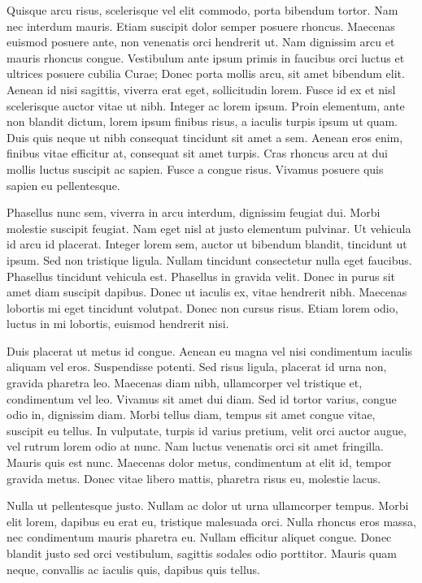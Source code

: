 \documentclass[11pt,]{article}
\begin{document}
Quisque arcu risus, scelerisque vel elit commodo, porta bibendum tortor.
Nam nec interdum mauris. Etiam suscipit dolor semper posuere rhoncus.
Maecenas euismod posuere ante, non venenatis orci hendrerit ut. Nam
dignissim arcu et mauris rhoncus congue. Vestibulum ante ipsum primis in
faucibus orci luctus et ultrices posuere cubilia Curae; Donec porta
mollis arcu, sit amet bibendum elit. Aenean id nisi sagittis, viverra
erat eget, sollicitudin lorem. Fusce id ex et nisl scelerisque auctor
vitae ut nibh. Integer ac lorem ipsum. Proin elementum, ante non blandit
dictum, lorem ipsum finibus risus, a iaculis turpis ipsum ut quam. Duis
quis neque ut nibh consequat tincidunt sit amet a sem. Aenean eros enim,
finibus vitae efficitur at, consequat sit amet turpis. Cras rhoncus arcu
at dui mollis luctus suscipit ac sapien. Fusce a congue risus. Vivamus
posuere quis sapien eu pellentesque.

Phasellus nunc sem, viverra in arcu interdum, dignissim feugiat dui.
Morbi molestie suscipit feugiat. Nam eget nisl at justo elementum
pulvinar. Ut vehicula id arcu id placerat. Integer lorem sem, auctor ut
bibendum blandit, tincidunt ut ipsum. Sed non tristique ligula. Nullam
tincidunt consectetur nulla eget faucibus. Phasellus tincidunt vehicula
est. Phasellus in gravida velit. Donec in purus sit amet diam suscipit
dapibus. Donec ut iaculis ex, vitae hendrerit nibh. Maecenas lobortis mi
eget tincidunt volutpat. Donec non cursus risus. Etiam lorem odio,
luctus in mi lobortis, euismod hendrerit nisi.

Duis placerat ut metus id congue. Aenean eu magna vel nisi condimentum
iaculis aliquam vel eros. Suspendisse potenti. Sed risus ligula,
placerat id urna non, gravida pharetra leo. Maecenas diam nibh,
ullamcorper vel tristique et, condimentum vel leo. Vivamus sit amet dui
diam. Sed id tortor varius, congue odio in, dignissim diam. Morbi tellus
diam, tempus sit amet congue vitae, suscipit eu tellus. In vulputate,
turpis id varius pretium, velit orci auctor augue, vel rutrum lorem odio
at nunc. Nam luctus venenatis orci sit amet fringilla. Mauris quis est
nunc. Maecenas dolor metus, condimentum at elit id, tempor gravida
metus. Donec vitae libero mattis, pharetra risus eu, molestie lacus.

Nulla ut pellentesque justo. Nullam ac dolor ut urna ullamcorper tempus.
Morbi elit lorem, dapibus eu erat eu, tristique malesuada orci. Nulla
rhoncus eros massa, nec condimentum mauris pharetra eu. Nullam efficitur
aliquet congue. Donec blandit justo sed orci vestibulum, sagittis
sodales odio porttitor. Mauris quam neque, convallis ac iaculis quis,
dapibus quis tellus.
\end{document}

